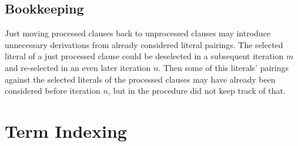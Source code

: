 \subsection{Bookkeeping}\label{sec:selected:literals:bookkeeping}

Just moving processed clauses back to unprocessed clauses may introduce unnecessary derivations from already considered literal pairings.
The selected literal of a just processed clause
could be deselected in a subsequent iteration \( m \)
and re-selected in an even later iteration \( n \).
Then some of this literals' pairings against
the selected literals of the processed clauses
may have already been considered before iteration \( n \),
but in the procedure did not keep track of that.
















\section{Term Indexing}









